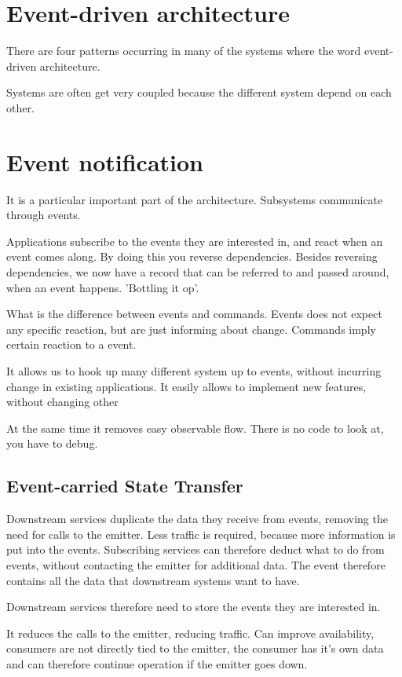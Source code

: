 \section{Event-driven architecture}

There are four patterns occurring in many of the systems where the word event-driven architecture.

Systems are often get very coupled because the different system depend on each other.

\section{Event notification}
It is a particular important part of the architecture. Subsystems communicate through events.

Applications subscribe to the events they are interested in, and react when an event comes along. 
By doing this you reverse dependencies.
Besides reversing dependencies, we now have a record that can be referred to and passed around, when an event happens. 'Bottling it op'.

What is the difference between events and commands. Events does not expect any specific reaction, but are just informing about change. Commands imply certain reaction to a event.

It allows us to hook up many different system up to events, without incurring change in existing applications. It easily allows to implement new features, without changing other

At the same time it removes easy observable flow. There is no code to look at, you have to debug.

\subsection{Event-carried State Transfer}
Downstream services duplicate the data they receive from events, removing the need for calls to the emitter. Less traffic is required, because more information is put into the events. Subscribing services can therefore deduct what to do from events, without contacting the emitter for additional data. The event therefore contains all the data that downstream systems want to have.

Downstream services therefore need to store the events they are interested in. 

It reduces the calls to the emitter, reducing traffic. Can improve availability, consumers are not directly tied to the emitter, the consumer has it's own data and can therefore continue operation if the emitter goes down.

